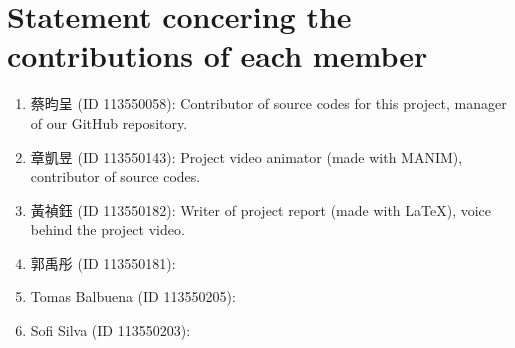 \section{Statement concering the contributions of each member}
\begin{enumerate}
    \item 蔡昀呈 (ID 113550058): Contributor of source codes for this project, 
    manager of our GitHub repository.
    \item 章凱昱 (ID 113550143): Project video animator (made with MANIM), 
    contributor of source codes.
    \item 黃禎鈺 (ID 113550182): Writer of project report (made with \LaTeX), 
    voice behind the project video.
    \item 郭禹彤 (ID 113550181): 
    \item Tomas Balbuena (ID 113550205): 
    \item Sofi Silva (ID 113550203): 
\end{enumerate}